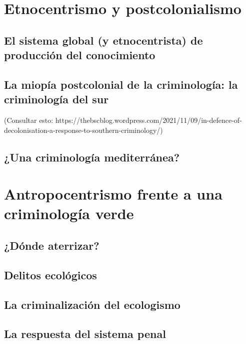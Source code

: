 \documentclass[
  spanish,
  letterpaper,
  DIV=11,
  numbers=noendperiod]{scrreprt}
\begin{document}
\chapter{Etnocentrismo y
postcolonialismo}\label{etnocentrismo-y-postcolonialismo}

\section{El sistema global (y etnocentrista) de producción del
conocimiento}\label{el-sistema-global-y-etnocentrista-de-producciuxf3n-del-conocimiento}

\section{La miopía postcolonial de la criminología: la criminología del
sur}\label{la-miopuxeda-postcolonial-de-la-criminologuxeda-la-criminologuxeda-del-sur}

(Consultar esto:
https://thebscblog.wordpress.com/2021/11/09/in-defence-of-decolonisation-a-response-to-southern-criminology/)

\section{¿Una criminología
mediterránea?}\label{una-criminologuxeda-mediterruxe1nea}

\chapter{Antropocentrismo frente a una criminología
verde}\label{antropocentrismo-frente-a-una-criminologuxeda-verde}

\section{¿Dónde aterrizar?}\label{duxf3nde-aterrizar}

\section{Delitos ecológicos}\label{delitos-ecoluxf3gicos}

\section{La criminalización del
ecologismo}\label{la-criminalizaciuxf3n-del-ecologismo}

\section{La respuesta del sistema
penal}\label{la-respuesta-del-sistema-penal}
\end{document}
